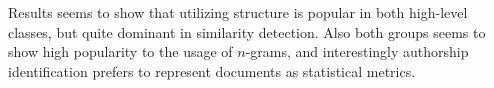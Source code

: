 Results seems to show that utilizing structure is popular in both high-level classes, but quite dominant in similarity detection. Also both groups seems to show high popularity to the usage of $n$-grams, and interestingly authorship identification prefers to represent documents as statistical metrics.
